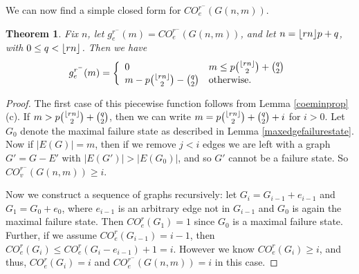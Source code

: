 \documentclass[12pt]{article}
\DeclarePairedDelimiter{\floor}{\lfloor}{\rfloor}
\newtheorem{theorem}{Theorem}[section]
\theoremstyle{definition}
\newtheorem{example}[theorem]{Example}
\newcommand{\COE}[2]{CO^{#1}_{e}(#2)}
\newcommand{\COVMIN}[1]{CO^{r^-}_{v}(#1)}
\newcommand{\COEMIN}[1]{CO^{r^-}_{e}(#1)}
\newcommand{\geMIN}[1]{g_{e}^{r^-}(#1)}
\begin{document}
\noindent We can now find a simple closed form for $\COEMIN{G(n,m)}$. 


\begin{theorem}
Fix $n$, let $\geMIN{m}=\COEMIN{G(n,m)}$, and let $n=\floor{rn}p+q$, with $0\le q < \floor{rn}$. Then we have \\
$$\geMIN{m}=
\left\{
\begin{array}{ll}
   0 & m \leq p {\floor{rn} \choose 2}+{q \choose 2} \\ 
   m-p {\floor{rn} \choose 2}-{q \choose 2} & \text{otherwise.} \\ 
\end{array}
\right.$$
\end{theorem}

\begin{proof}
The first case of this piecewise function follows from Lemma \ref{coeminprop}(c). If $m>p{\floor{rn} \choose 2}+{q \choose 2}$, then we can write $m=p{\floor{rn} \choose 2}+{q \choose 2}+i$ for $i>0$. Let $G_{0}$ denote the maximal failure state as described in Lemma \ref{maxedgefailurestate}. Now if $|E(G)|=m$, then if we remove $j<i$ edges we are left with a graph $G'=G-E'$ with $|E(G')|>|E(G_{0})|$, and so $G'$ cannot be a failure state. So $\COVMIN{G(n,m)}\ge i$. 


Now we construct a sequence of graphs recursively: let $G_{i}=G_{i-1}+e_{i-1}$ and $G_{1}=G_{0}+e_{0}$, where $e_{i-1}$ is an arbitrary edge not in $G_{i-1}$ and $G_{0}$ is again the maximal failure state. Then $\COE{r}{G_{1}}=1$ since $G_{0}$ is a maximal failure state. Further, if we assume $\COE{r}{G_{i-1}}=i-1$, then $\COE{r}{G_{i}}\le \COE{r}{G_{i}-e_{i-1}}+1=i$. However we know $\COE{r}{G_{i}}\ge i$, and thus, $\COE{r}{G_{i}}=i$ and $\COEMIN{G(n,m)}=i$ in this case.



\end{proof}

\end{document}
